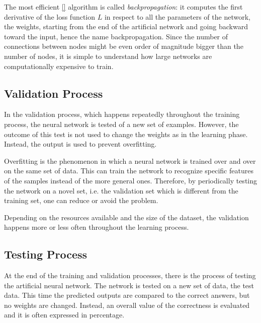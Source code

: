 The most efficient \ref{} algorithm is called \textit{backpropagation}: it computes the first derivative of the loss function $L$ in respect to all the parameters of the network, the weights, starting from the end of the artificial network and going backward toward the input, hence the name backpropagation.
Since the number of connections between nodes might be even order of magnitude bigger than the number of nodes, it is simple to understand how large networks are computationally expensive to train.


\subsection{Validation Process}
\label{ssec:Validation_Process}
In the validation process, which happens repeatedly throughout the training process, the neural network is tested of a new set of examples.
However, the outcome of this test is not used to change the weights as in the learning phase.
Instead, the output is used to prevent overfitting.

Overfitting is the phenomenon in which a neural network is trained over and over on the same set of data.
This can train the network to recognize specific features of the samples instead of the more general ones.
Therefore, by periodically testing the network on a novel set, i.e. the validation set which is different from the training set, one can reduce or avoid the problem.

Depending on the resources available and the size of the dataset, the validation happens more or less often throughout the learning process.


\subsection{Testing Process}
\label{ssec:Testing_Process}
At the end of the training and validation processes, there is the process of testing the artificial neural network.
The network is tested on a new set of data, the test data.
This time the predicted outputs are compared to the correct answers, but no weights are changed.
Instead, an overall value of the correctness is evaluated and it is often expressed in percentage.

